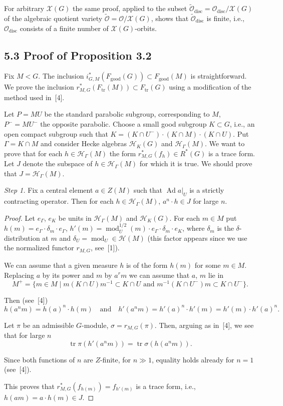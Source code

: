 \documentclass[12pt,a4paper]{article}
\theoremstyle{plain}
\theoremstyle{definition}
\theoremstyle{remark}
\DeclareMathOperator{\tr}{tr}
\DeclareMathOperator{\disc}{disc}
\DeclareMathOperator{\Ad}{Ad}
\DeclareMathOperator{\modu}{mod}
\newcommand{\cH}{\mathscr{H}}
\newcommand{\cO}{\mathcal{O}}
\newcommand{\cX}{\mathcal{X}}
\begin{document}
For arbitrary $\cX(G)$ the same proof, applied to the subset $\tilde{\cO}_{\disc} = \cO_{\disc}/\cX(G)$ of the algebraic quotient variety $\tilde{\cO} = \cO/\cX(G)$, shows that $\tilde{\cO}_{\disc}$ is finite, i.e., $\cO_{\disc}$ consists of a finite number of $\cX(G)$-orbits.

\subsection*{5.3 Proof of Proposition 3.2}

Fix $M < G$. The inclusion $i_{G,M}^*(F_{\text{good}}(G)) \subset F_{\text{good}}(M)$ is straightforward. We prove the inclusion $r_{M,G}^*(F_{\tr}(M)) \subset F_{\tr}(G)$ using a modification of the method used in~[4].

Let $P = MU$ be the standard parabolic subgroup, corresponding to $M$, $P^- = MU^-$ the opposite parabolic. Choose a small good subgroup $K \subset G$, i.e., an open compact subgroup such that $K = (K \cap U^-) \cdot (K \cap M) \cdot (K \cap U)$. Put $\Gamma = K \cap M$ and consider Hecke algebras $\cH_K(G)$ and $\cH_{\Gamma}(M)$. We want to prove that for each $h \in \cH_{\Gamma}(M)$ the form $r_{M,G}^*(f_h) \in R^*(G)$ is a trace form. Let $J$ denote the subspace of $h \in \cH_{\Gamma}(M)$ for which it is true. We should prove that $J = \cH_{\Gamma}(M)$.

\textit{Step 1.} Fix a central element $a \in Z(M)$ such that $\Ad a|_U$ is a strictly contracting operator. Then for each $h \in \cH_{\Gamma}(M)$, $a^n \cdot h \in J$ for large $n$.

\begin{proof}
Let $e_{\Gamma}$, $e_K$ be units in $\cH_{\Gamma}(M)$ and $\cH_K(G)$. For each $m \in M$ put $h(m) = e_{\Gamma} \cdot \delta_m \cdot e_{\Gamma}$, $h'(m) = \modu_U^{1/2}(m) \cdot e_{\Gamma} \cdot \delta_m \cdot e_K$, where $\delta_m$ is the $\delta$-distribution at $m$ and $\delta_U = \modu_U \in \cH(M)$ (this factor appears since we use the normalized functor $r_{M,G}$, see~[1]).

We can assume that a given measure $h$ is of the form $h(m)$ for some $m \in M$. Replacing $a$ by its power and $m$ by $a^r m$ we can assume that $a$, $m$ lie in
\[
M^+ = \{m \in M \mid m(K \cap U)m^{-1} \subset K \cap U \text{ and } m^{-1}(K \cap U^-)m \subset K \cap U^-\}.
\]

Then (see~[4])
\[
h(a^n m) = h(a)^n \cdot h(m) \quad \text{and} \quad h'(a^n m) = h'(a)^n \cdot h'(m) = h'(m) \cdot h'(a)^n.
\]

Let $\pi$ be an admissible $G$-module, $\sigma = r_{M,G}(\pi)$. Then, arguing as in~[4], we see that for large $n$
\[
\tr \pi(h'(a^n m)) = \tr \sigma(h(a^n m)).
\]

Since both functions of $n$ are $Z$-finite, for $n \gg 1$, equality holds already for $n = 1$ (see~[4]).

This proves that $r_{M,G}^*(f_{h(m)}) = f_{h'(m)}$ is a trace form, i.e., $h(am) = a \cdot h(m) \in J$.
\end{proof}
\end{document}
